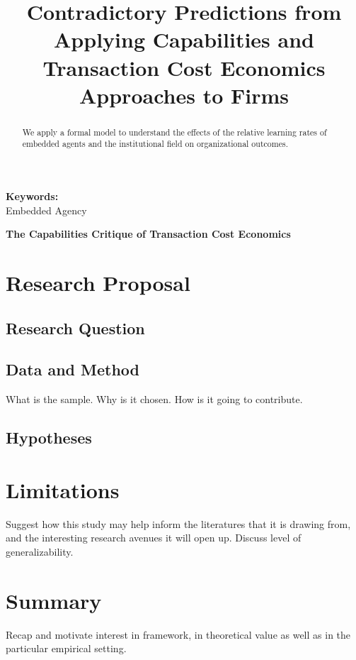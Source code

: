 \documentclass[12pt,letterpaper]{article}
\begin{document}
\title{Contradictory Predictions from Applying Capabilities and Transaction Cost Economics Approaches to Firms}
\date{}
\maketitle

\begin{abstract} 
\normalsize 
We apply a formal model to understand the effects of the relative learning rates of embedded agents and the institutional field on organizational outcomes. 
\end{abstract}


{\textbf{Keywords:} \\\indent Embedded Agency}

\newpage
\pagestyle{fancy}
\fancyhf{}
\rhead{\thepage}

\begin{center}
\textbf{The Capabilities Critique of Transaction Cost Economics}
\end{center}





\section{Research Proposal}
\subsection{Research Question}

\subsection{Data and Method}
What is the sample. Why is it chosen. How is it going to contribute.

\subsection{Hypotheses}

\section{Limitations}
Suggest how this study may help inform the literatures that it is drawing from, and the interesting research avenues it will open up. Discuss level of generalizability.

\section{Summary}
Recap and motivate interest in framework, in theoretical value as well as in the particular empirical setting.
\end{document}
